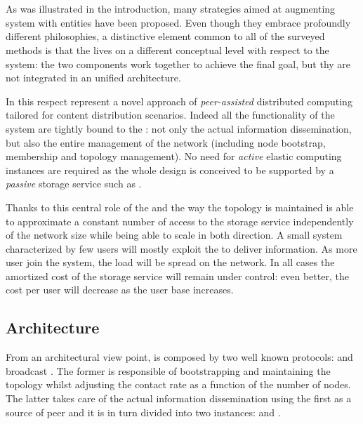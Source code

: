 \chapter{\cloudcast}

As was illustrated in the introduction, many strategies aimed at
augmenting \ptop system with \cloud entities have been
proposed. Even though they embrace profoundly different philosophies,
a distinctive element common to all of the surveyed methods
is that the \cloud lives on a different conceptual level with respect
to the \ptop system: the two components work together to achieve the
final goal, but thy are not integrated in an unified architecture.

In this respect \cloudcast \cite{Cloudcast} represent a novel approach
of \emph{peer-assisted} distributed computing tailored for content
distribution scenarios. Indeed all the functionality of the system are
tightly bound to the \cloud: not only the actual information
dissemination, but also the entire management of the \ptop network
(including node bootstrap, membership and topology management). No need
for \emph{active} elastic computing instances are required as the
whole design is conceived to be supported by a \emph{passive} storage
service such as \amazonsss.

Thanks to this central role of the \cloud and the way the topology is
maintained \cloudcast is able to approximate a constant number of access
to the storage service independently of the network size while
being able to scale in both direction. A small system characterized by
few users will mostly exploit the \cloud to deliver information. As
more user join the system, the load will be spread on the
\ptop network. In all cases the amortized cost of the storage service
will remain under control: even better, the cost per user will
decrease as the user base increases.

\section{Architecture}
From an architectural view point, \cloudcast is composed by two
well known \gossip protocols:
\peersampling \cite{GossipPeerSampling}
and \epidemic broadcast \cite{EpidemicAlgorithms}.
The former is responsible of bootstrapping and maintaining the topology
whilst adjusting the \cloud contact rate as a function of the number
of nodes. The latter takes care of the actual information
dissemination using the first as a source of peer and it is in turn
divided into two instances: \antientropy and \rumormongering.


